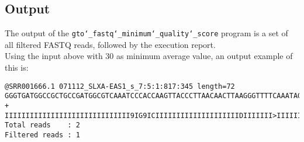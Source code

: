 \subsection*{Output}
The output of the \texttt{gto\char`_fastq\char`_minimum\char`_quality\char`_score} program is a set of all filtered FASTQ reads, followed by the execution report.\\
Using the input above with 30 as minimum average value, an output example of this is:
\begin{lstlisting}
@SRR001666.1 071112_SLXA-EAS1_s_7:5:1:817:345 length=72
GGGTGATGGCCGCTGCCGATGGCGTCAAATCCCACCAAGTTACCCTTAACAACTTAAGGGTTTTCAAATAGA
+
IIIIIIIIIIIIIIIIIIIIIIIIIIIIII9IG9ICIIIIIIIIIIIIIIIIIIIIDIIIIIII>IIIIII/
Total reads    : 2
Filtered reads : 1
\end{lstlisting}
